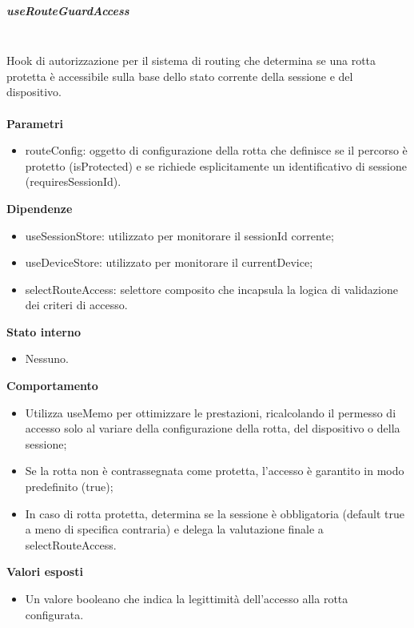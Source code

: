 \documentclass[a4paper,12pt]{article}
\begin{document}
                \subparagraph{useRouteGuardAccess}\mbox{}\\
                Hook di autorizzazione per il sistema di routing che determina se una rotta protetta è accessibile sulla base dello stato corrente della sessione e del dispositivo.\\\\
                \textbf{Parametri}
                \begin{itemize}
                    \item {\ttfamily routeConfig}: oggetto di configurazione della rotta che definisce se il percorso è protetto ({\ttfamily isProtected}) e se richiede esplicitamente un identificativo di sessione ({\ttfamily requiresSessionId}).
                \end{itemize}
                \textbf{Dipendenze}
                \begin{itemize}
                    \item {\ttfamily useSessionStore}: utilizzato per monitorare il {\ttfamily sessionId} corrente;
                    \item {\ttfamily useDeviceStore}: utilizzato per monitorare il {\ttfamily currentDevice};
                    \item {\ttfamily selectRouteAccess}: selettore composito che incapsula la logica di validazione dei criteri di accesso.
                \end{itemize}
                \textbf{Stato interno}
                \begin{itemize}
                    \item Nessuno.
                \end{itemize}
                \textbf{Comportamento}
                \begin{itemize}
                    \item Utilizza {\ttfamily useMemo} per ottimizzare le prestazioni, ricalcolando il permesso di accesso solo al variare della configurazione della rotta, del dispositivo o della sessione;
                    \item Se la rotta non è contrassegnata come protetta, l'accesso è garantito in modo predefinito ({\ttfamily true});
                    \item In caso di rotta protetta, determina se la sessione è obbligatoria (default {\ttfamily true} a meno di specifica contraria) e delega la valutazione finale a {\ttfamily selectRouteAccess}.
                \end{itemize}
                \textbf{Valori esposti}
                \begin{itemize}
                    \item Un valore booleano che indica la legittimità dell'accesso alla rotta configurata.
                \end{itemize}
\end{document}

